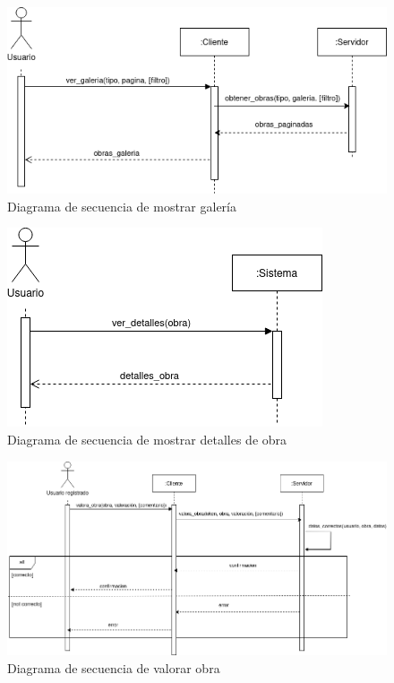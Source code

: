 \begin{figure}[H]
    \centering
    \includegraphics[width=\textwidth]{diagramas/secuencia_mostrar_galeria.png}
    \caption{Diagrama de secuencia de mostrar galería}
    \label{fig:mostrar_galeria}
\end{figure}

\begin{figure}[H]
    \centering
    \includegraphics[width=\textwidth]{diagramas/secuencia_mostrar_detalles_obra.png}
    \caption{Diagrama de secuencia de mostrar detalles de obra}
    \label{fig:mostrar_detalles_obra}
\end{figure}

\begin{figure}[H]
    \centering
    \includegraphics[width=\textwidth]{diagramas/secuencia_valorar_obra.png}
    \caption{Diagrama de secuencia de valorar obra}
    \label{fig:valorar_obra}
\end{figure}

